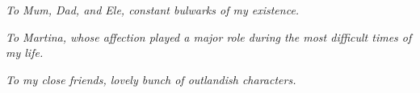 \newpage \vspace*{8cm}
\thispagestyle{empty}

\begin{flushright}
   \emph{To Mum, Dad, and Ele, constant bulwarks of my existence.}
\end{flushright}

\begin{flushright}
   \emph{To Martina, whose affection played a major role during the most difficult times of my life.}
\end{flushright}

\begin{flushright}
   \emph{To my close friends, lovely bunch of outlandish characters.}
\end{flushright}